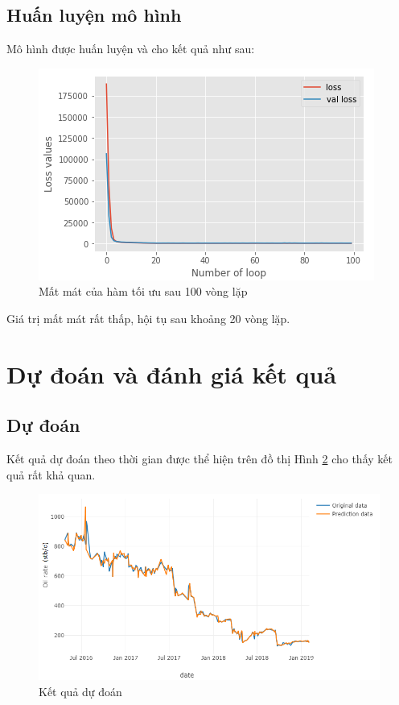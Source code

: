 \documentclass[12pt,a4paper]{report}
\begin{document}
\subsection{Huấn luyện mô hình}
Mô hình được huấn luyện và cho kết quả như sau:
\newpage
    \begin{figure}[h]
        \centering
        \includegraphics[scale=1.3]{fig/loss.png}
        \caption{Mất mát của hàm tối ưu sau 100 vòng lặp}
        \label{fig:loss}
    \end{figure}
Giá trị mất mát rất thấp, hội tụ sau khoảng 20 vòng lặp.
\clearpage
\section{Dự đoán và đánh giá kết quả}
\subsection{Dự đoán}
Kết quả dự đoán theo thời gian được thể hiện trên đồ thị Hình \ref{fig:evalua} cho thấy kết quả rất khả quan.
    \begin{figure}[h]
        \centering
        \includegraphics[scale=.85]{fig/evalua.PNG}
        \caption{Kết quả dự đoán}
        \label{fig:evalua}
    \end{figure}
\end{document}
